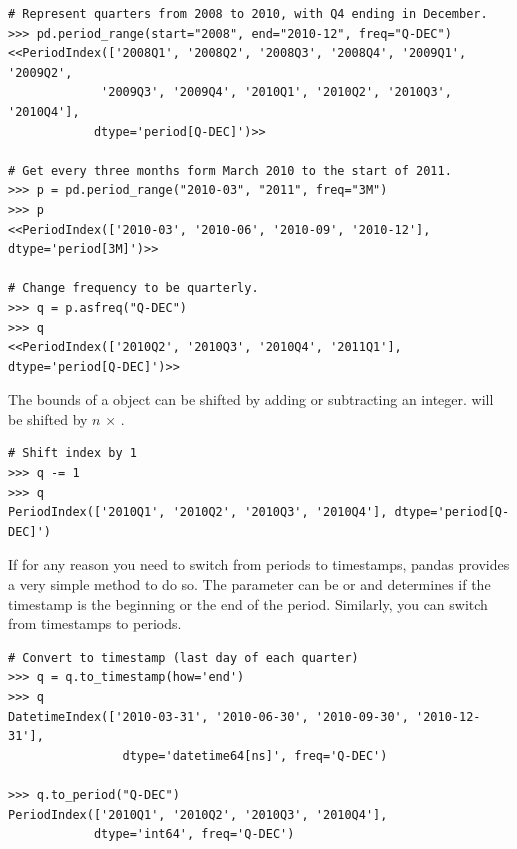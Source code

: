 \begin{lstlisting}
# Represent quarters from 2008 to 2010, with Q4 ending in December.
>>> pd.period_range(start="2008", end="2010-12", freq="Q-DEC")
<<PeriodIndex(['2008Q1', '2008Q2', '2008Q3', '2008Q4', '2009Q1', '2009Q2',
             '2009Q3', '2009Q4', '2010Q1', '2010Q2', '2010Q3', '2010Q4'],
            dtype='period[Q-DEC]')>>

# Get every three months form March 2010 to the start of 2011.
>>> p = pd.period_range("2010-03", "2011", freq="3M")
>>> p
<<PeriodIndex(['2010-03', '2010-06', '2010-09', '2010-12'], dtype='period[3M]')>>

# Change frequency to be quarterly.
>>> q = p.asfreq("Q-DEC")
>>> q
<<PeriodIndex(['2010Q2', '2010Q3', '2010Q4', '2011Q1'], dtype='period[Q-DEC]')>>
\end{lstlisting}

The bounds of a  object can be shifted by adding or subtracting an integer.
  will be shifted by $n$ $\times$ .

\begin{lstlisting}
# Shift index by 1
>>> q -= 1
>>> q
PeriodIndex(['2010Q1', '2010Q2', '2010Q3', '2010Q4'], dtype='period[Q-DEC]')
\end{lstlisting}

If for any reason you need to switch from periods to timestamps, pandas provides a very simple method to do so.
The  parameter can be  or  and determines if the timestamp is the beginning or the end of the period.
Similarly, you can switch from timestamps to periods.

\begin{lstlisting}
# Convert to timestamp (last day of each quarter)
>>> q = q.to_timestamp(how='end')
>>> q
DatetimeIndex(['2010-03-31', '2010-06-30', '2010-09-30', '2010-12-31'],
                dtype='datetime64[ns]', freq='Q-DEC')

>>> q.to_period("Q-DEC")
PeriodIndex(['2010Q1', '2010Q2', '2010Q3', '2010Q4'],
            dtype='int64', freq='Q-DEC')

\end{lstlisting}

